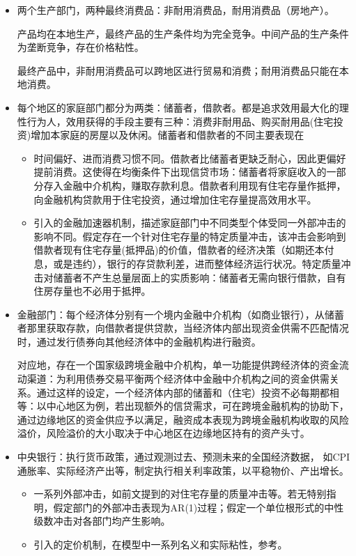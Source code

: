   \begin{itemize}
    \item 两个生产部门，两种最终消费品：非耐用消费品，耐用消费品（房地产）。

    产品均在本地生产，最终产品的生产条件均为完全竞争。中间产品的生产条件为垄断竞争，存在价格粘性。

    最终产品中，非耐用消费品可以跨地区进行贸易和消费；耐用消费品只能在本地消费。

    \item 每个地区的家庭部门都分为两类：储蓄者，借款者。都是追求效用最大化的理性行为人，效用获得的手段主要有三种：消费非耐用品、购买耐用品(住宅投资)增加本家庭的房屋以及休闲。储蓄者和借款者的不同主要表现在
    \begin{itemize}
      \item 时间偏好、进而消费习惯不同。借款者比储蓄者更缺乏耐心，因此更偏好提前消费。这使得在均衡条件下出现信贷市场：储蓄者将家庭收入的一部分存入金融中介机构，赚取存款利息。借款者利用现有住宅存量作抵押，向金融机构贷款用于住宅投资，通过增加住宅存量提高效用水平。

      \item 引入\cite{Bernanke1999}的金融加速器机制，描述家庭部门中不同类型个体受同一外部冲击的影响不同。假定存在一个针对住宅存量的特定质量冲击，该冲击会影响到借款者现有住宅存量(抵押品)的价值，借款者的经济决策（如期还本付息，或是违约），银行的存贷款利差，进而整体经济运行状况。特定质量冲击对储蓄者不产生总量层面上的实质影响：储蓄者无需向银行借款，自有住房存量也不必用于抵押。
    \end{itemize}

    \item 金融部门：每个经济体分别有一个境内金融中介机构（如商业银行），从储蓄者那里获取存款，向借款者提供贷款，当经济体内部出现资金供需不匹配情况时，通过发行债券向其他经济体中的金融机构进行融资。

    对应地，存在一个国家级跨境金融中介机构，单一功能提供跨经济体的资金流动渠道：为利用债券交易平衡两个经济体中金融中介机构之间的资金供需关系。通过这样的设定，一个经济体内部的储蓄和（住宅）投资不必每期都相等：以中心地区为例，若出现额外的信贷需求，可在跨境金融机构的协助下，通过边缘地区的资金供应予以满足，融资成本表现为跨境金融机构收取的风险溢价，风险溢价的大小取决于中心地区在边缘地区持有的资产头寸。

    \item 中央银行：执行货币政策，通过观测过去、预测未来的全国经济数据，
如CPI通胀率、实际经济产出等，制定执行相关利率政策，以平稳物价、产出增长。
\begin{itemize}
  \item 一系列外部冲击，如前文提到的对住宅存量的质量冲击等。若无特别指明，假定部门的外部冲击表现为AR(1)过程；假定一个单位根形式的中性级数冲击对各部门均产生影响。
  \item 引入\cite{Calvo:1983uq}的定价机制，在模型中一系列名义和实际粘性，参考\cite{Smets:2003ic,Iacoviello:2010fo,Christiano:2005ib}。
  \end{itemize}
\end{itemize}

